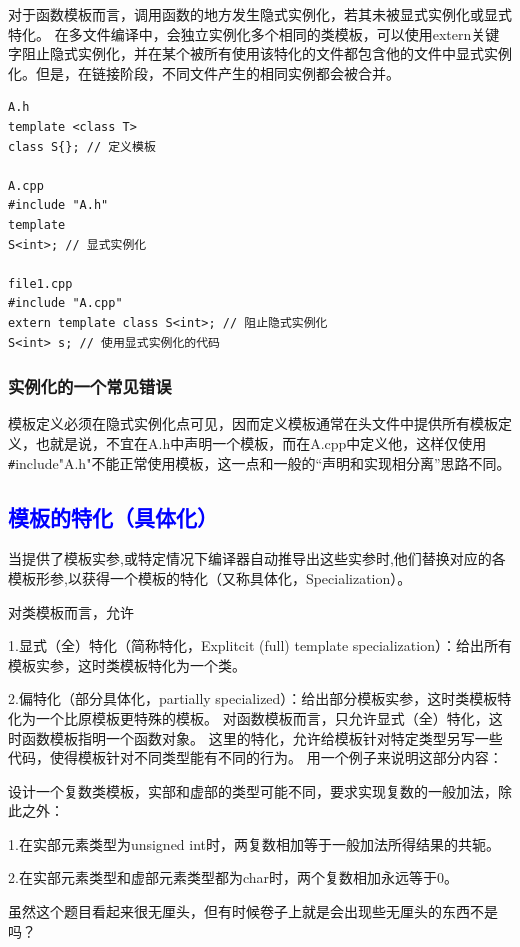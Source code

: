 \documentclass[UTF8]{ctexart}
\begin{document}
对于函数模板而言，调用函数的地方发生隐式实例化，若其未被显式实例化或显式特化。
在多文件编译中，会独立实例化多个相同的类模板，可以使用extern关键字阻止隐式实例化，并在某个被所有使用该特化的文件都包含他的文件中显式实例化。但是，在链接阶段，不同文件产生的相同实例都会被合并。
\begin{lstlisting}
A.h
template <class T>
class S{}; // 定义模板

A.cpp
#include "A.h"
template
S<int>; // 显式实例化

file1.cpp
#include "A.cpp"
extern template class S<int>; // 阻止隐式实例化
S<int> s; // 使用显式实例化的代码
\end{lstlisting}

\subsubsection{实例化的一个常见错误}
模板定义必须在隐式实例化点可见，因而定义模板通常在头文件中提供所有模板定义，也就是说，不宜在A.h中声明一个模板，而在A.cpp中定义他，这样仅使用\verb|#|include"A.h"不能正常使用模板，这一点和一般的“声明和实现相分离”思路不同。

\subsection{\textcolor{blue}{模板的特化（具体化）}}
当提供了模板实参,或特定情况下编译器自动推导出这些实参时,他们替换对应的各模板形参,以获得一个模板的特化（又称具体化，Specialization）。

对类模板而言，允许

1.显式（全）特化（简称特化，Explitcit (full) template specialization）：给出所有模板实参，这时类模板特化为一个类。

2.偏特化（部分具体化，partially specialized）：给出部分模板实参，这时类模板特化为一个比原模板更特殊的模板。 对函数模板而言，只允许显式（全）特化，这时函数模板指明一个函数对象。 这里的特化，允许给模板针对特定类型另写一些代码，使得模板针对不同类型能有不同的行为。 用一个例子来说明这部分内容：

设计一个复数类模板，实部和虚部的类型可能不同，要求实现复数的一般加法，除此之外：

1.在实部元素类型为unsigned int时，两复数相加等于一般加法所得结果的共轭。

2.在实部元素类型和虚部元素类型都为char时，两个复数相加永远等于0。

虽然这个题目看起来很无厘头，但有时候卷子上就是会出现些无厘头的东西不是吗？
\end{document}
